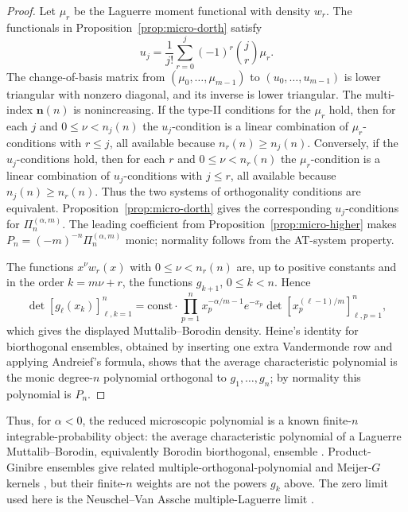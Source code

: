 \documentclass[reqno]{article}
\theoremstyle{definition}
\theoremstyle{remark}
\theoremstyle{plain}
\begin{document}
\begin{proof}
Let $\mu_r$ be the Laguerre moment functional with density $w_r$. The functionals in Proposition~\ref{prop:micro-dorth} satisfy
\[
u_j=\frac1{j!}\sum_{r=0}^j(-1)^r\binom jr\mu_r .
\]
The change-of-basis matrix from $(\mu_0,\dots,\mu_{m-1})$ to $(u_0,\dots,u_{m-1})$ is lower triangular with nonzero diagonal, and its inverse is lower triangular. The multi-index $\boldsymbol n(n)$ is nonincreasing. If the type-II conditions for the $\mu_r$ hold, then for each $j$ and $0\le\nu<n_j(n)$ the $u_j$-condition is a linear combination of $\mu_r$-conditions with $r\le j$, all available because $n_r(n)\ge n_j(n)$. Conversely, if the $u_j$-conditions hold, then for each $r$ and $0\le\nu<n_r(n)$ the $\mu_r$-condition is a linear combination of $u_j$-conditions with $j\le r$, all available because $n_j(n)\ge n_r(n)$. Thus the two systems of orthogonality conditions are equivalent. Proposition~\ref{prop:micro-dorth} gives the corresponding $u_j$-conditions for $\Pi_n^{(\alpha,m)}$. The leading coefficient from Proposition~\ref{prop:micro-higher} makes $P_n=(-m)^{-n}\Pi_n^{(\alpha,m)}$ monic; normality follows from the AT-system property.

The functions $x^\nu w_r(x)$ with $0\le\nu<n_r(n)$ are, up to positive constants and in the order $k=m\nu+r$, the functions $g_{k+1}$, $0\le k<n$. Hence
\[
\det[g_\ell(x_k)]_{\ell,k=1}^n
=\text{const}\cdot\prod_{p=1}^n x_p^{-\alpha/m-1}e^{-x_p}
\det[x_p^{(\ell-1)/m}]_{\ell,p=1}^n,
\]
which gives the displayed Muttalib--Borodin density. Heine's identity for biorthogonal ensembles, obtained by inserting one extra Vandermonde row and applying Andreief's formula, shows that the average characteristic polynomial is the monic degree-$n$ polynomial orthogonal to $g_1,\dots,g_n$; by normality this polynomial is $P_n$.
\end{proof}

Thus, for $\alpha<0$, the reduced microscopic polynomial is a known finite-$n$ integrable-probability object: the average characteristic polynomial of a Laguerre Muttalib--Borodin, equivalently Borodin biorthogonal, ensemble \cite{Borodin98,FW}. Product-Ginibre ensembles give related multiple-orthogonal-polynomial and Meijer-$G$ kernels \cite{AIK,KZ}, but their finite-$n$ weights are not the powers $g_k$ above. The zero limit used here is the Neuschel--Van Assche multiple-Laguerre limit \cite{NVA}.
\end{document}
